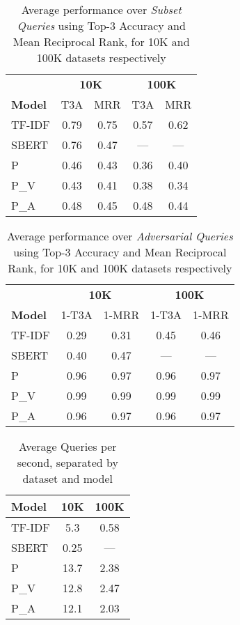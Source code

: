 \documentclass[11pt]{article}
\begin{document}
\begin{table}[h!]
    \centering
    \caption{Average performance over \emph{Subset Queries} using Top-3 Accuracy
    and Mean Reciprocal Rank, for 10K and 100K datasets
respectively}\label{tab:sub_perf}
    \begin{tabular}{l c c c c}
        \toprule
        & \multicolumn{2}{c}{\textbf{10K}} & \multicolumn{2}{c}{\textbf{100K}} \\
        \cmidrule(lr){2-3} \cmidrule(lr){4-5}
        \textbf{Model} & T3A & MRR & T3A& MRR \\
        \midrule
        TF-IDF & 0.79 & 0.75 & 0.57 & 0.62 \\
        SBERT & 0.76 & 0.47 & --- & --- \\
        P & 0.46 & 0.43 & 0.36 & 0.40 \\
        P\_V & 0.43 & 0.41 & 0.38 & 0.34 \\
        P\_A & 0.48 & 0.45 & 0.48 & 0.44 \\
        \bottomrule
    \end{tabular}
\end{table}
\begin{table}[h!]
    \centering
    \caption{Average performance over \emph{Adversarial Queries} using Top-3
    Accuracy and Mean Reciprocal Rank, for 10K and 100K datasets
respectively}\label{tab:adv_perf}
    \begin{tabular}{l c c c c}
        \toprule
        & \multicolumn{2}{c}{\textbf{10K}} & \multicolumn{2}{c}{\textbf{100K}} \\
        \cmidrule(lr){2-3} \cmidrule(lr){4-5}
        \textbf{Model} & 1-T3A & 1-MRR & 1-T3A & 1-MRR \\
        \midrule
        TF-IDF & 0.29 & 0.31 & 0.45 & 0.46 \\
        SBERT & 0.40 & 0.47 & --- & --- \\
        P & 0.96 & 0.97 & 0.96 & 0.97 \\
        P\_V & 0.99 & 0.99 & 0.99 & 0.99 \\
        P\_A & 0.96 & 0.97 & 0.96 & 0.97 \\
        \bottomrule
    \end{tabular}
\end{table}
\begin{table}[h!]
    \centering
    \caption{Average Queries per second, separated by dataset and
    model}\label{tab:query_speed}
    \begin{tabular}{l c c}
        \toprule
        \textbf{Model} & \textbf{10K} & \textbf{100K} \\
        \midrule
        TF-IDF & 5.3 & 0.58 \\
        SBERT & 0.25 & --- \\
        P & 13.7 & 2.38 \\
        P\_V & 12.8 & 2.47 \\
        P\_A & 12.1 & 2.03 \\
        \bottomrule
    \end{tabular}
\end{table}
\end{document}

